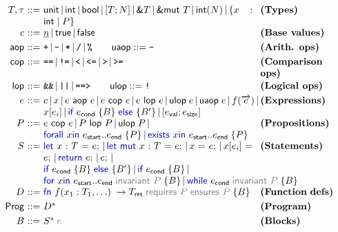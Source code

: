 {\small
\[
\renewcommand{\arraystretch}{1.09}
\begin{array}{@{}r@{\ }c@{\ }l@{\hspace{0.8em}}p{0.22\textwidth}@{}}
  T, \tau & ::= &
  \parbox[t]{0.63\textwidth}{
    $\textsf{unit} \,|\, \textsf{int} \,|\, \textsf{bool} \,|\, [T; N] \,|\, \textsf{\&}T \,|\, \textsf{\&mut } T \,|\, \textsf{int}(N) \,|\, \{ x:\textsf{int} \mid P \}$
  }
  & \textbf{(Types)} \\[2pt]
  c & ::= &
  \underline{n} \,|\, \textsf{true} \,|\, \textsf{false}
  & \textbf{(Base values)} \\[2pt]
  \textsf{aop} & ::= &
  \texttt{+} \,|\, \texttt{-} \,|\, \texttt{*} \,|\, \texttt{/} \,|\, \texttt{\%}
  \qquad \textsf{uaop} ::= \texttt{-}
  & \textbf{(Arith. ops)} \\[2pt]
  \textsf{cop} & ::= &
  \texttt{==} \,|\, \texttt{!=} \,|\, \texttt{<} \,|\, \texttt{<=} \,|\, \texttt{>} \,|\, \texttt{>=}
  & \textbf{(Comparison ops)} \\[2pt]
  \textsf{lop} & ::= &
  \texttt{\&\&} \,|\, \texttt{||} \,|\, \texttt{==>}
  \qquad \textsf{ulop} ::= \texttt{!}
  & \textbf{(Logical ops)} \\[2pt]
  e & ::= &
  \parbox[t]{0.63\textwidth}{
    $c \,|\, x \,|\, e \textsf{ aop } e \,|\, e \textsf{ cop } e \,|\, e \textsf{ lop } e \,|\, \textsf{ulop}\; e \,|\, \textsf{uaop}\; e \,|\, f(\overrightarrow{e}) \,|\, {}$\\
    $x[e_i] \,|\, \kw{if } e_\textsf{cond}\; \{B\}\; \kw{else } \{B'\} \,|\, [e_\textsf{val}; e_\textsf{size}]$
  }
  & \textbf{(Expressions)} \\[4pt]
  P & ::= &
  \parbox[t]{0.63\textwidth}{
    $e \textsf{ cop } e \,|\, P \textsf{ lop } P \,|\, \textsf{ulop}\; P \,|\, {}$\\
    $\kw{forall } x \kw{in } e_\textsf{start}..e_\textsf{end}\;\{P\} \,|\, \kw{exists } x \kw{in } e_\textsf{start}..e_\textsf{end}\;\{P\}$
  }
  & \textbf{(Propositions)} \\[4pt]
  S & ::= &
  \parbox[t]{0.63\textwidth}{
    $\kw{let } x:T = e; \,|\, \kw{let mut } x:T = e; \,|\, x = e; \,|\, x[e_i] = e; \,|\, \kw{return } e; \,|\, e; \,|\, {}$\\
    $\kw{if } e_\textsf{cond}\; \{B\}\; \kw{else } \{B'\} \,|\, \kw{if } e_\textsf{cond}\; \{B\} \,|\, {}$\\ 
    $\kw{for } x \kw{in } e_\textsf{start}..e_\textsf{end}\; \optclause{\textsf{invariant } P}\; \{B\} \,|\, \kw{while } e_\textsf{cond}\; \optclause{\textsf{invariant } P}\; \{B\}$
  }
  & \textbf{(Statements)} \\[4pt]
  D & ::= &
  \parbox[t]{0.63\textwidth}{
    $\kw{fn } f(x_1:T_1, \ldots)\; \rightarrow T_\textsf{ret}\; \optclause{\textsf{requires } P}\;\optclause{\textsf{ensures } P}\; \{B\}$
  }
  & \textbf{(Function defs)} \\[2pt]
  \textsf{Prog} & ::= &
  D^*
  & \textbf{(Program)} \\[2pt]
  B & ::= &
  S^*\; \optclause{e}
  & \textbf{(Blocks)}
\end{array}
\]
}

